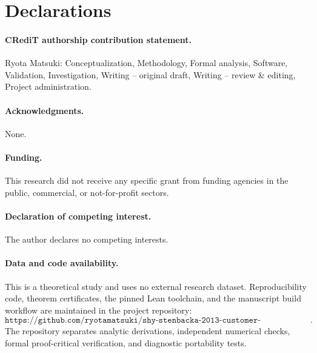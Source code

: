 \section*{Declarations}

\paragraph{CRediT authorship contribution statement.}
Ryota Matsuki: Conceptualization, Methodology, Formal analysis, Software, Validation, Investigation, Writing -- original draft, Writing -- review \& editing, Project administration.

\paragraph{Acknowledgments.}
None.

\paragraph{Funding.}
This research did not receive any specific grant from funding agencies in the public, commercial, or not-for-profit sectors.

\paragraph{Declaration of competing interest.}
The author declares no competing interests.

\paragraph{Data and code availability.}
This is a theoretical study and uses no external research dataset.  Reproducibility code, theorem certificates, the pinned Lean toolchain, and the manuscript build workflow are maintained in the project repository:
\[
\texttt{https://github.com/ryotamatsuki/shy-stenbacka-2013-customer-recognition-reassessment}.
\]
The repository separates analytic derivations, independent numerical checks, formal proof-critical verification, and diagnostic portability tests.
